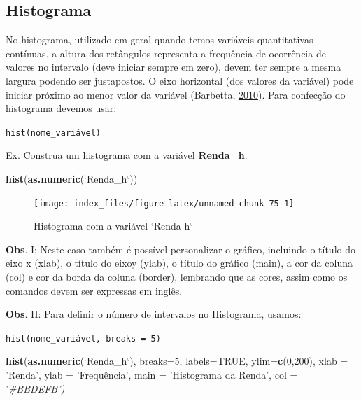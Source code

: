 \documentclass[12pt,brazil,oneside]{book}
\newenvironment{Shaded}{\begin{snugshade}}{\end{snugshade}}
\newcommand{\CommentTok}[1]{\textcolor[rgb]{0.56,0.35,0.01}{\textit{#1}}}
\newcommand{\DataTypeTok}[1]{\textcolor[rgb]{0.13,0.29,0.53}{#1}}
\newcommand{\DecValTok}[1]{\textcolor[rgb]{0.00,0.00,0.81}{#1}}
\newcommand{\KeywordTok}[1]{\textcolor[rgb]{0.13,0.29,0.53}{\textbf{#1}}}
\newcommand{\NormalTok}[1]{#1}
\newcommand{\OtherTok}[1]{\textcolor[rgb]{0.56,0.35,0.01}{#1}}
\newcommand{\StringTok}[1]{\textcolor[rgb]{0.31,0.60,0.02}{#1}}
\begin{document}
\hypertarget{histograma}{%
\subsection{Histograma}\label{histograma}}

No histograma, utilizado em geral quando temos variáveis quantitativas contínuas, a altura dos retângulos representa a frequência de ocorrência de valores no intervalo (deve iniciar sempre em zero), devem ter sempre a mesma largura podendo ser justapostos. O eixo horizontal (dos valores da variável) pode iniciar próximo ao menor valor da variável (Barbetta, \protect\hyperlink{ref-barbetta1988}{2010}). Para confecção do histograma devemos usar:

\texttt{hist(nome\_variável)}

Ex. Construa um histograma com a variável \textbf{Renda\_h}.

\begin{Shaded}
\begin{Highlighting}[]
\KeywordTok{hist}\NormalTok{(}\KeywordTok{as.numeric}\NormalTok{(}\StringTok{`}\DataTypeTok{Renda_h}\StringTok{`}\NormalTok{))}
\end{Highlighting}
\end{Shaded}

\begin{figure}[H]

{\centering \texttt{[image: index\_files/figure-latex/unnamed-chunk-75-1]} 

}

\caption{Histograma com a variável `Renda h`}\label{fig:unnamed-chunk-75}
\end{figure}

\textbf{Obs}. I: Neste caso também é possível personalizar o gráfico, incluindo o título do eixo x (xlab), o título do eixoy (ylab), o título do gráfico (main), a cor da coluna (col) e cor da borda da coluna (border), lembrando que as cores, assim como os comandos devem ser expressas em inglês.

\textbf{Obs}. II: Para definir o número de intervalos no Histograma, usamos:

\texttt{hist(nome\_variável,\ breaks\ =\ 5)}

\begin{Shaded}
\begin{Highlighting}[]
\KeywordTok{hist}\NormalTok{(}\KeywordTok{as.numeric}\NormalTok{(}\StringTok{`}\DataTypeTok{Renda_h}\StringTok{`}\NormalTok{), }
     \DataTypeTok{breaks=}\DecValTok{5}\NormalTok{, }
     \DataTypeTok{labels=}\OtherTok{TRUE}\NormalTok{, }
     \DataTypeTok{ylim=}\KeywordTok{c}\NormalTok{(}\DecValTok{0}\NormalTok{,}\DecValTok{200}\NormalTok{), }
     \DataTypeTok{xlab =} \StringTok{'Renda'}\NormalTok{,}
     \DataTypeTok{ylab =} \StringTok{'Frequência',}
\StringTok{     main = '}\NormalTok{Histograma da Renda}\StringTok{',}
\StringTok{     col = '}\CommentTok{#BBDEFB')}
\end{Highlighting}
\end{Shaded}
\end{document}
